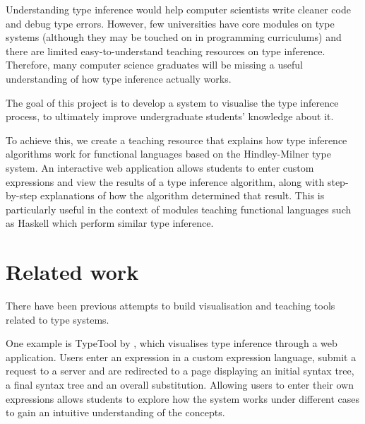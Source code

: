 \documentclass[a4paper,fleqn,oneside,12pt]{report}
\begin{document}
Understanding type inference would help computer scientists write cleaner code and debug type errors. However, few universities have core modules on type systems (although they may be touched on in programming curriculums) and there are limited easy-to-understand teaching resources on type inference. Therefore, many computer science graduates will be missing a useful understanding of how type inference actually works.

The goal of this project is to develop a system to visualise the type inference process, to ultimately improve undergraduate students’ knowledge about it.

To achieve this, we create a teaching resource that explains how type inference algorithms work for functional languages based on the Hindley-Milner type system. An interactive web application allows students to enter custom expressions and view the results of a type inference algorithm, along with step-by-step explanations of how the algorithm determined that result. This is particularly useful in the context of modules teaching functional languages such as Haskell which perform similar type inference.

\section{Related work}\label{id:h.2mwaav7jkal4}

There have been previous attempts to build visualisation and teaching tools related to type systems.

One example is TypeTool by \cite{ref4}, which visualises type inference through a web application. Users enter an expression in a custom expression language, submit a request to a server and are redirected to a page displaying an initial syntax tree, a final syntax tree and an overall substitution. Allowing users to enter their own expressions allows students to explore how the system works under different cases to gain an intuitive understanding of the concepts.
\end{document}
